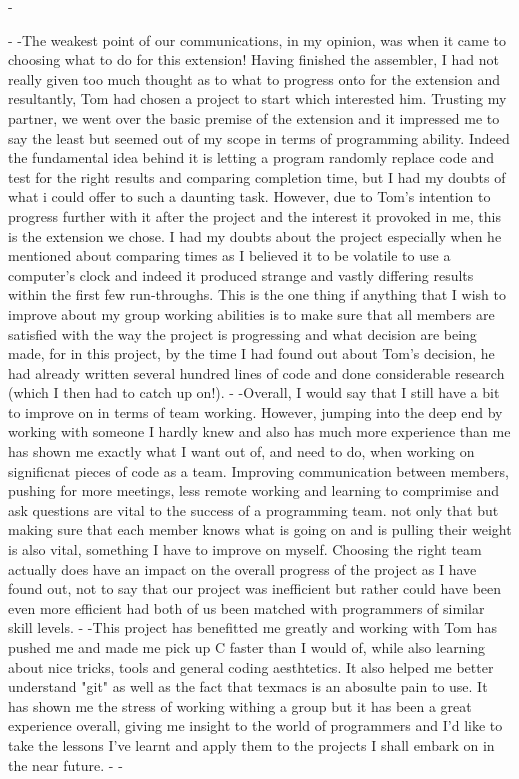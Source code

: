 -\documentclass[11pt]{article}
\begin{document}
-
-The weakest point of our communications, in my opinion, was when it came to choosing what to do for this extension! Having finished the assembler, I had not really given too much thought as to what to progress onto for the extension and resultantly, Tom had chosen a project to start which interested him. Trusting my partner, we went over the basic premise of the extension and it impressed me to say the least but seemed out of my scope in terms of programming ability. Indeed the fundamental idea behind it is letting a program randomly replace code and test for the right results and comparing completion time, but I had my doubts of what i could offer to such a daunting task. However, due to Tom's intention to progress further with it after the project and the interest it provoked in me, this is the extension we chose. I had my doubts about the project especially when he mentioned about comparing times as I believed it to be volatile to use a computer's clock and indeed it produced strange and vastly differing results within the first few run-throughs. This is the one thing if anything that I wish to improve about my group working abilities is to make sure that all members are satisfied with the way the project is progressing and what decision are being made, for in this project, by the time I had found out about Tom's decision, he had already written several hundred lines of code and done considerable research (which I then had to catch up on!).
-
-Overall, I would say that I still have a bit to improve on in terms of team working. However, jumping into the deep end by working with someone I hardly knew and also has much more experience than me has shown me exactly what I want out of, and need to do, when working on significnat pieces of code as a team. Improving communication between members, pushing for more meetings, less remote working and learning to comprimise and ask questions are vital to the success of a programming team. not only that but making sure that each member knows what is going on and is pulling their weight is also vital, something I have to improve on myself. Choosing the right team actually does have an impact on the overall progress of the project as I have found out, not to say that our project was inefficient but rather could have been even more efficient had both of us been matched with programmers of similar skill levels.
-
-This project has benefitted me greatly and working with Tom has pushed me and made me pick up C faster than I would of, while also learning about nice tricks, tools and general coding aesthtetics. It also helped me better understand "git" as well as the fact that texmacs is an abosulte pain to use. It has shown me the stress of working withing a group but it has been a great experience overall, giving me insight to the world of programmers and I'd like to take the lessons I've learnt and apply them to the projects I shall embark on in the near future.
-
-
\end{document}
